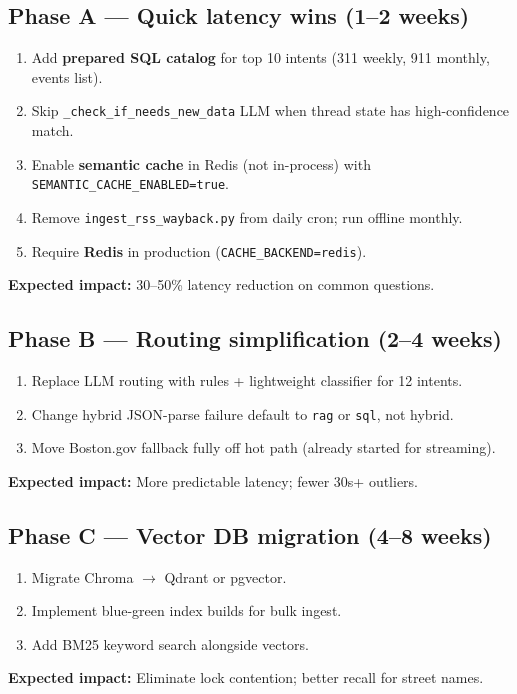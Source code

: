\documentclass[11pt,a4paper]{article}
\begin{document}
\subsection{Phase A --- Quick latency wins (1--2 weeks)}
\begin{enumerate}
  \item Add \textbf{prepared SQL catalog} for top 10 intents (311 weekly, 911 monthly, events list).
  \item Skip \texttt{\_check\_if\_needs\_new\_data} LLM when thread state has high-confidence match.
  \item Enable \textbf{semantic cache} in Redis (not in-process) with \texttt{SEMANTIC\_CACHE\_ENABLED=true}.
  \item Remove \texttt{ingest\_rss\_wayback.py} from daily cron; run offline monthly.
  \item Require \textbf{Redis} in production (\texttt{CACHE\_BACKEND=redis}).
\end{enumerate}
\textbf{Expected impact:} 30--50\% latency reduction on common questions.

\subsection{Phase B --- Routing simplification (2--4 weeks)}
\begin{enumerate}
  \item Replace LLM routing with rules + lightweight classifier for 12 intents.
  \item Change hybrid JSON-parse failure default to \texttt{rag} or \texttt{sql}, not hybrid.
  \item Move Boston.gov fallback fully off hot path (already started for streaming).
\end{enumerate}
\textbf{Expected impact:} More predictable latency; fewer 30s+ outliers.

\subsection{Phase C --- Vector DB migration (4--8 weeks)}
\begin{enumerate}
  \item Migrate Chroma $\rightarrow$ Qdrant or pgvector.
  \item Implement blue-green index builds for bulk ingest.
  \item Add BM25 keyword search alongside vectors.
\end{enumerate}
\textbf{Expected impact:} Eliminate lock contention; better recall for street names.
\end{document}
